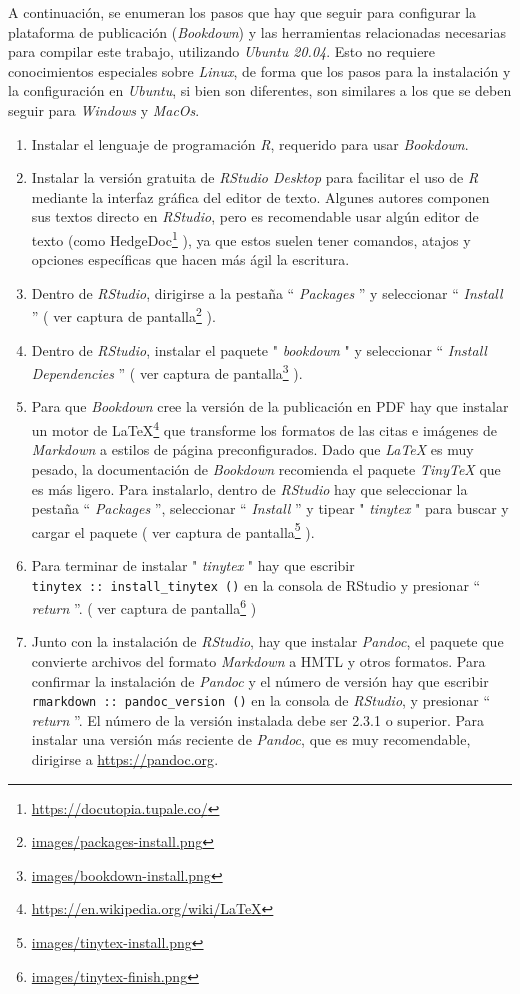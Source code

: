 \documentclass[
]{krantz}
\DeclareRobustCommand{\href}[2]{#2\footnote{\url{#1}}}
\begin{document}
A continuación, se enumeran los pasos que hay que seguir para configurar la plataforma de publicación (\emph{Bookdown}) y las herramientas relacionadas necesarias para compilar este trabajo, utilizando \emph{Ubuntu 20.04}. Esto no requiere conocimientos especiales sobre \emph{Linux}, de forma que los pasos para la instalación y la configuración en \emph{Ubuntu}, si bien son diferentes, son similares a los que se deben seguir para \emph{Windows} y \emph{MacOs}.

\begin{enumerate}
\def\labelenumi{\arabic{enumi}.}
\item
  Instalar el lenguaje de programación \emph{R}, requerido para usar \emph{Bookdown}.
\item
  Instalar la versión gratuita de \emph{RStudio Desktop} para facilitar el uso de \emph{R} mediante la interfaz gráfica del editor de texto. Algunes autores componen sus textos directo en \emph{RStudio}, pero es recomendable usar algún editor de texto (como \href{https://docutopia.tupale.co/}{HedgeDoc} ), ya que estos suelen tener comandos, atajos y opciones específicas que hacen más ágil la escritura.
\item
  Dentro de \emph{RStudio}, dirigirse a la pestaña `` \emph{Packages} '' y seleccionar `` \emph{Install} '' ( \href{images/packages-install.png}{ver captura de pantalla} ).
\item
  Dentro de \emph{RStudio}, instalar el paquete " \emph{bookdown} " y seleccionar `` \emph{Install Dependencies} '' ( \href{images/bookdown-install.png}{ver captura de pantalla} ).
\item
  Para que \emph{Bookdown} cree la versión de la publicación en PDF hay que instalar un motor de \href{https://en.wikipedia.org/wiki/LaTeX}{LaTeX} que transforme los formatos de las citas e imágenes de \emph{Markdown} a estilos de página preconfigurados. Dado que \emph{LaTeX} es muy pesado, la documentación de \emph{Bookdown} recomienda el paquete \emph{TinyTeX} que es más ligero. Para instalarlo, dentro de \emph{RStudio} hay que seleccionar la pestaña `` \emph{Packages} '', seleccionar `` \emph{Install} '' y tipear " \emph{tinytex} " para buscar y cargar el paquete ( \href{images/tinytex-install.png}{ver captura de pantalla} ).
\item
  Para terminar de instalar " \emph{tinytex} " hay que escribir \texttt{tinytex\ ::\ install\_tinytex\ ()} en la consola de RStudio y presionar `` \emph{return} ''. ( \href{images/tinytex-finish.png}{ver captura de pantalla} )
\item
  Junto con la instalación de \emph{RStudio}, hay que instalar \emph{Pandoc}, el paquete que convierte archivos del formato \emph{Markdown} a HMTL y otros formatos. Para confirmar la instalación de \emph{Pandoc} y el número de versión hay que escribir \texttt{rmarkdown\ ::\ pandoc\_version\ ()} en la consola de \emph{RStudio}, y presionar `` \emph{return} ''. El número de la versión instalada debe ser 2.3.1 o superior. Para instalar una versión más reciente de \emph{Pandoc}, que es muy recomendable, dirigirse a \url{https://pandoc.org}.
\end{enumerate}
\end{document}
